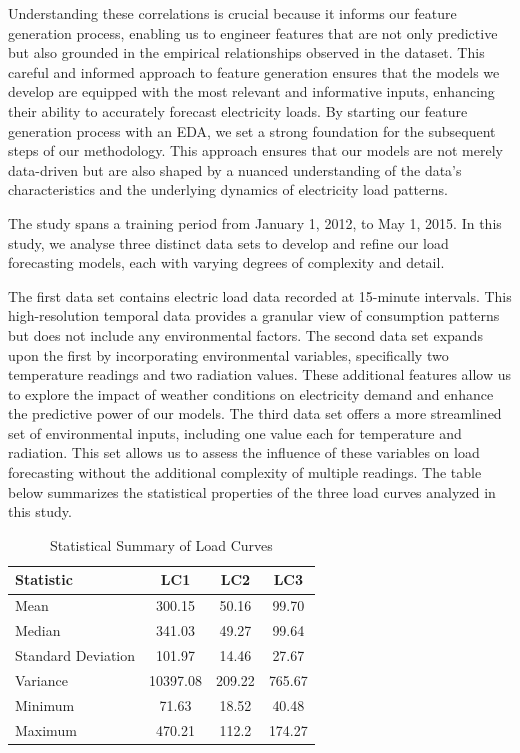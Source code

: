 \documentclass{article} %
\begin{document}
Understanding these correlations is crucial because it informs our feature generation process, enabling us to engineer features that are not only predictive but also grounded in the empirical relationships observed in the dataset. This careful and informed approach to feature generation ensures that the models we develop are equipped with the most relevant and informative inputs, enhancing their ability to accurately forecast electricity loads. By starting our feature generation process with an \gls*{EDA}, we set a strong foundation for the subsequent steps of our methodology. This approach ensures that our models are not merely data-driven but are also shaped by a nuanced understanding of the data's characteristics and the underlying dynamics of electricity load patterns. 

The study spans a training period from January 1, 2012, to May 1, 2015. In this study, we analyse three distinct data sets to develop and refine our load forecasting models, each with varying degrees of complexity and detail. 

The first data set contains electric load data recorded at 15-minute intervals. This high-resolution temporal data provides a granular view of consumption patterns but does not include any environmental factors. The second data set expands upon the first by incorporating environmental variables, specifically two temperature readings and two radiation values. These additional features allow us to explore the impact of weather conditions on electricity demand and enhance the predictive power of our models. The third data set offers a more streamlined set of environmental inputs, including one value each for temperature and radiation. This set allows us to assess the influence of these variables on load forecasting without the additional complexity of multiple readings. 
The table below summarizes the statistical properties of the three load curves analyzed in this study.
\begin{table}[ht]
\centering
\caption{Statistical Summary of Load Curves}
\label{tab:lc_statistics}
\begin{tabular}{@{}lccc@{}}
\toprule
Statistic & LC1 & LC2 & LC3 \\ \midrule
Mean & 300.15 & 50.16 & 99.70 \\
Median & 341.03 & 49.27 & 99.64 \\
Standard Deviation & 101.97 & 14.46 & 27.67 \\
Variance & 10397.08 & 209.22 & 765.67 \\
Minimum & 71.63 & 18.52 & 40.48 \\
Maximum & 470.21 & 112.2 & 174.27 \\ \bottomrule
\end{tabular}
\end{table}
\end{document}
